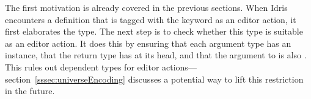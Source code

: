 The first motivation is already covered in the previous sections.
When Idris encounters a definition that is tagged with the 
keyword as an editor action, it first elaborates the type.
The next step is to check whether this type is suitable as an editor action.
It does this by ensuring that each argument type has an \Editorable{} instance,
that the return type has \Elab{} at its head, and that the argument to \Elab{}
is also \Editorable{}.
This rules out dependent types for editor
actions---section~\ref{sssec:universeEncoding} discusses a potential way to lift
this restriction in the future.


